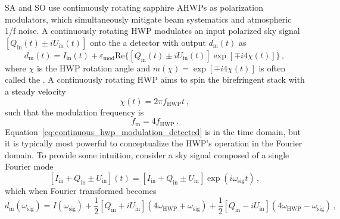 SA and SO use continuously rotating sapphire AHWPs as polarization modulators, which simultaneously mitigate beam systematics and atmospheric 1/f noise. A continuously rotating HWP modulates an input polarized sky signal $[Q_{\mathrm{in}}(t) \pm i U_{\mathrm{in}}(t)]$ onto the a detector with output $d_{\mathrm{m}}(t)$ as
\begin{equation}
    d_{\mathrm{m}}(t) = I_{\mathrm{in}}(t) + \varepsilon_{\mathrm{mod}} \mathrm{Re} \{ \left[ Q_{\mathrm{in}}(t) \pm i U_{\mathrm{in}}(t) \right] \exp \left[ \mp i 4 \chi(t) \right] \} \, ,
    \label{eq:continuous_hwp_modulation_detected}
\end{equation}
where $\chi$ is the HWP rotation angle and $m(\chi) = \exp \left[ \mp i 4 \chi(t) \right]$ is often called the . A continuously rotating HWP aims to spin the birefringent stack with a steady velocity
\begin{equation}
    \chi(t) = 2 \pi f_{\mathrm{HWP}} t \, ,
    \label{eq:hwp_angle_frequency}
\end{equation}
such that the modulation frequency is
\begin{equation}
    f_{\mathrm{m}} = 4 f_{\mathrm{HWP}} \, .
    \label{eq:modulation_frequency}
\end{equation}
Equation~\ref{eq:continuous_hwp_modulation_detected} is in the time domain, but it is typically most powerful to conceptualize the HWP's operation in the Fourier domain. To provide some intuition, consider a sky signal composed of a single Fourier mode
\begin{equation}
    \left[ I_{\mathrm{in}} + Q_{\mathrm{in}} \pm U_{\mathrm{in}} \right](t) = \left[ I_{\mathrm{in}} + Q_{\mathrm{in}} \pm U_{\mathrm{in}} \right] \exp \left( i \omega_{\mathrm{sig}} t \right) \, ,
    \label{eq:sky_polarization_signal_single_mode}
\end{equation}
which when Fourier transformed becomes
\begin{equation}
    d_{\mathrm{m}}(\omega_{\mathrm{sig}}) = I(\omega_{\mathrm{sig}}) + \frac{1}{2} \left[ Q_{\mathrm{in}} + i U_{\mathrm{in}} \right](4 \omega_{\mathrm{HWP}} + \omega_{\mathrm{sig}}) +  \frac{1}{2} \left[ Q_{\mathrm{in}} - i U_{\mathrm{in}} \right](4 \omega_{\mathrm{HWP}} - \omega_{\mathrm{sig}}) \, ,
    \label{eq:modulated_detector_output_fourier_domain}
\end{equation}

